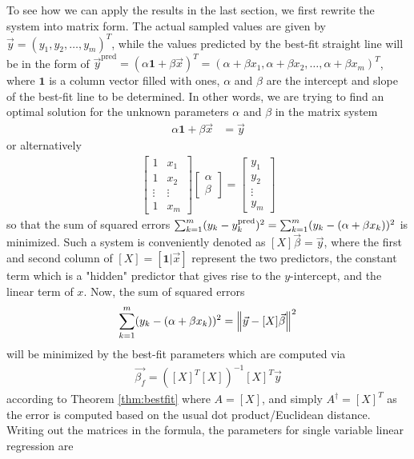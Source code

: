 To see how we can apply the results in the last section, we first rewrite the system into matrix form. The actual sampled values are given by $\vec{y} = (y_1, y_2, \ldots, y_m)^T$, while the values predicted by the best-fit straight line will be in the form of $\vec{y}^{\text{pred}} = (\alpha\textbf{1} + \beta \vec{x})^T = (\alpha + \beta x_1, \alpha + \beta x_2, \ldots, \alpha + \beta x_m)^T$, where $\textbf{1}$ is a column vector filled with ones, $\alpha$ and $\beta$ are the intercept and slope of the best-fit line to be determined. In other words, we are trying to find an optimal solution for the unknown parameters $\alpha$ and $\beta$ in the matrix system
\begin{align}
\alpha\textbf{1} + \beta \vec{x} &= \vec{y}
\end{align}
or alternatively
\begin{align}
\begin{bmatrix}
1 & x_1 \\
1 & x_2 \\
\vdots & \vdots \\
1 & x_m
\end{bmatrix}
\begin{bmatrix}
\alpha \\
\beta
\end{bmatrix}
=
\begin{bmatrix}
y_1 \\
y_2 \\
\vdots \\
y_m
\end{bmatrix}
\end{align}
so that the sum of squared errors $\smash{\sum_{k=1}^m (y_k - y^{\text{pred}}_k)^2} = \sum_{k=1}^m (y_k - (\alpha + \beta x_k))^2$ is minimized. Such a system is conveniently denoted as $[X]\vec{\beta} = \vec{y}$, where the first and second column of $[X] = [\textbf{1}|\vec{x}]$ represent the two predictors, the constant term which is a "hidden" predictor that gives rise to the $y$-intercept, and the linear term of $x$. Now, the sum of squared errors
\begin{align}
\sum_{k=1}^m (y_k - (\alpha + \beta x_k))^2 = \norm{\vec{y} - [X]\vec{\beta}}^2    
\end{align}
will be minimized by the best-fit parameters which are computed via
\begin{align}
\vec{\beta_f} = ([X]^T[X])^{-1}[X]^T \vec{y}
\end{align}
according to Theorem \ref{thm:bestfit} where $A = [X]$, and simply $A^\dag = [X]^T$ as the error is computed based on the usual dot product/Euclidean distance. Writing out the matrices in the formula, the parameters for single variable linear regression are
